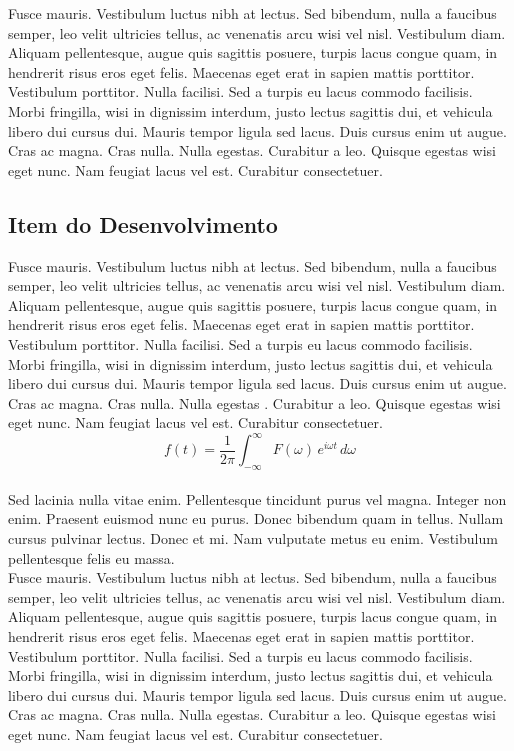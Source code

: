 Fusce mauris. Vestibulum luctus nibh at lectus. Sed bibendum, nulla a faucibus semper, leo
velit ultricies tellus, ac venenatis arcu wisi vel nisl. Vestibulum diam. Aliquam pellentesque,
augue quis sagittis posuere, turpis lacus congue quam, in hendrerit risus eros eget felis.
Maecenas eget erat in sapien mattis porttitor. Vestibulum porttitor. Nulla facilisi. Sed a
turpis eu lacus commodo facilisis. Morbi fringilla, wisi in dignissim interdum, justo lectus
sagittis dui, et vehicula libero dui cursus dui. Mauris tempor ligula sed lacus. Duis cursus
enim ut augue. Cras ac magna. Cras nulla. Nulla egestas. Curabitur a leo. Quisque egestas
wisi eget nunc. Nam feugiat lacus vel est. Curabitur consectetuer. \\

\subsection{Item do Desenvolvimento}

Fusce mauris. Vestibulum luctus nibh at lectus. Sed bibendum, nulla a faucibus semper, leo
velit ultricies tellus, ac venenatis arcu wisi vel nisl. Vestibulum diam. Aliquam pellentesque,
augue quis sagittis posuere, turpis lacus congue quam, in hendrerit risus eros eget felis.
Maecenas eget erat in sapien mattis porttitor. Vestibulum porttitor. Nulla facilisi. Sed a
turpis eu lacus commodo facilisis. Morbi fringilla, wisi in dignissim interdum, justo lectus
sagittis dui, et vehicula libero dui cursus dui. Mauris tempor ligula sed lacus. Duis cursus
enim ut augue. Cras ac magna. Cras nulla. Nulla egestas \cite{einstein}. Curabitur a leo. Quisque egestas
wisi eget nunc. Nam feugiat lacus vel est. Curabitur consectetuer. \\

$$
f(t) = \frac{1}{2\pi} \int_{-\infty}^{\infty} F(\omega) \, e^{i\omega t} \, d\omega
$$ \\

Sed lacinia nulla vitae enim. Pellentesque tincidunt purus vel magna.
Integer non enim. Praesent euismod nunc eu purus. Donec bibendum quam in tellus.
Nullam cursus pulvinar lectus. Donec et mi. Nam vulputate metus eu enim. Vestibulum
pellentesque felis eu massa. \\

Fusce mauris. Vestibulum luctus nibh at lectus. Sed bibendum, nulla a faucibus semper, leo
velit ultricies tellus, ac venenatis arcu wisi vel nisl. Vestibulum diam. Aliquam pellentesque,
augue quis sagittis posuere, turpis lacus congue quam, in hendrerit risus eros eget felis.
Maecenas eget erat in sapien mattis porttitor. Vestibulum porttitor. Nulla facilisi. Sed a
turpis eu lacus commodo facilisis. Morbi fringilla, wisi in dignissim interdum, justo lectus
sagittis dui, et vehicula libero dui cursus dui. Mauris tempor ligula sed lacus. Duis cursus
enim ut augue. Cras ac magna. Cras nulla. Nulla egestas. Curabitur a leo. Quisque egestas
wisi eget nunc. Nam feugiat lacus vel est. Curabitur consectetuer. \\


